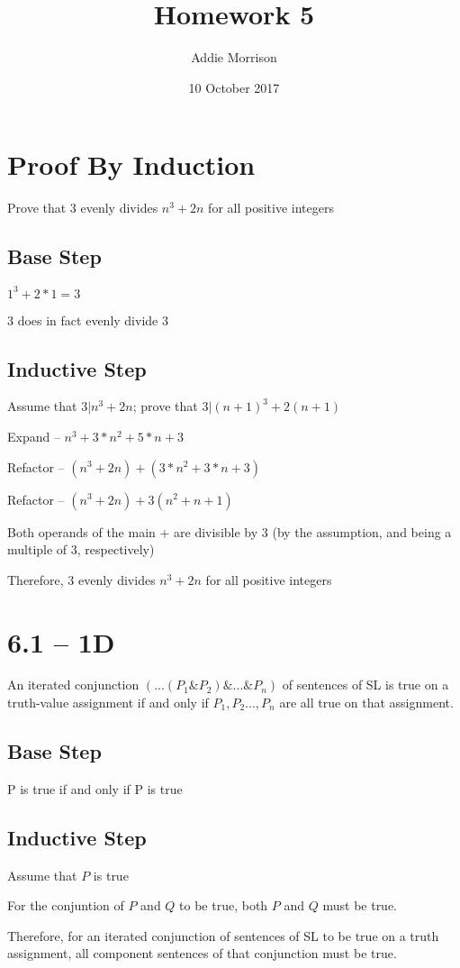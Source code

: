 \documentclass{hitec}
\title{Homework 5}
\author{Addie Morrison}
\date{10 October 2017}
\begin{document}
\maketitle
\section*{Proof By Induction}
Prove that 3 evenly divides $n^3 + 2n$ for all positive integers

\subsection*{Base Step}

$1^3 + 2*1=3$

3 does in fact evenly divide 3
\subsection*{Inductive Step}
Assume that $3|n^3+2n$; prove that $3|(n+1)^3 + 2(n+1)$

Expand -- $n^3 + 3*n^2 + 5*n + 3$

Refactor -- $(n^3 + 2n) + (3*n^2 + 3*n + 3)$

Refactor -- $(n^3 + 2n) + 3(n^2 + n + 1)$

Both operands of the main + are divisible by 3 (by the assumption, and being a multiple of 3, respectively)

Therefore, 3 evenly divides $n^3 + 2n$ for all positive integers

\section*{6.1 -- 1D}
An iterated conjunction $(...(P_1 \& P_2) \& ... \& P_n)$ of sentences of SL is true on a truth-value assignment if and only if $P_1, P_2 ..., P_n$ are all true on that assignment.

\subsection*{Base Step}
P is true if and only if P is true

\subsection*{Inductive Step}
Assume that $P$ is true

For the conjuntion of $P$ and $Q$ to be true, both $P$ and $Q$ must be true.

Therefore, for an iterated conjunction of sentences of SL to be true on a truth assignment, all component sentences of that conjunction must be true.
\end{document}
